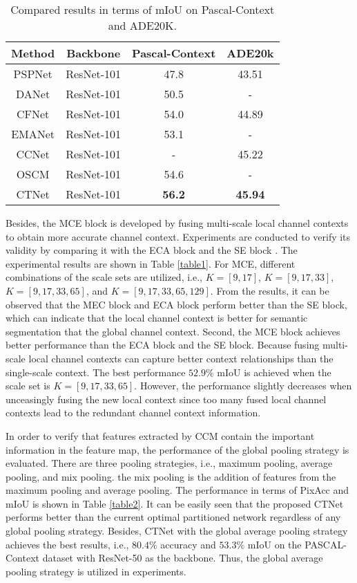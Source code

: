 \documentclass[10pt,journal,cspaper,compsoc]{IEEEtran}
\begin{document}
\begin{table}[!t]
\caption{Compared results in terms of mIoU on Pascal-Context and ADE20K.}
\label{table4}
\renewcommand\arraystretch{1.3}
		\centering
		\begin{tabular}{c|c|c|c}
			\hline
			Method &Backbone&Pascal-Context &ADE20k\\
			\hline
			PSPNet \cite{zhao2017pyramid}  & ResNet-101&47.8 &43.51\\
			\hline
			DANet \cite{fu2019dual}&  ResNet-101 &50.5& -\\
			CFNet \cite{zhang2019co} & ResNet-101 & 54.0& 44.89\\
			EMANet \cite{li2019expectation}& ResNet-101& 53.1& -\\
			CCNet \cite{huang2019ccnet}& ResNet-101 & - & 45.22\\
			\hline
			OSCM &ResNet-101&54.6&-\\
			CTNet &ResNet-101 &\textbf{56.2}& \textbf{45.94}\\
			\hline
\end{tabular}
\end{table}
	
Besides, the MCE block is developed by fusing multi-scale local channel contexts to obtain more accurate channel context. Experiments are conducted to verify its validity by comparing it with the ECA block \cite{wang2020eca} and the SE block \cite{hu2018squeeze}. The experimental results are shown in Table \ref{table1}. For MCE, different combinations of the scale sets are utilized, i.e., $K=[9, 17]$, $K=[9, 17, 33]$, $K=[9, 17, 33, 65]$, and $K=[9, 17, 33, 65, 129]$. From the results, it can be observed that the MEC block and ECA block perform better than the SE block, which can indicate that the local channel context is better for semantic segmentation that the global channel context. Second, the MCE block achieves better performance than the ECA block and the SE block. Because fusing multi-scale local channel contexts can capture better context relationships than the single-scale context. The best performance $52.9\%$ mIoU is achieved when the scale set is $K=[9, 17, 33, 65]$. However, the performance slightly decreases when unceasingly fusing the new local context since too many fused local channel contexts lead to the redundant channel context information.
	
In order to verify that features extracted by CCM contain the important information in the feature map, the performance of the global pooling strategy is evaluated. There are three pooling strategies, i.e., maximum pooling, average pooling, and mix pooling. the mix pooling is the addition of features from the maximum pooling and average pooling. The performance in terms of PixAcc and mIoU is shown in Table \ref{table2}. It can be easily seen that the proposed CTNet performs better than the current optimal partitioned network regardless of any global pooling strategy. Besides, CTNet with the global average pooling strategy achieves the best results, i.e., $80.4\%$ accuracy and $53.3\%$ mIoU on the PASCAL-Context dataset with ResNet-50 as the backbone. Thus, the global average pooling strategy is utilized in experiments.
	
\end{document}
